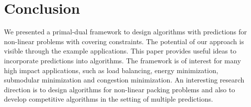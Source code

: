
\section{Conclusion}

We presented a primal-dual
framework to design algorithms with predictions for non-linear problems with covering constraints. The potential of our approach is visible through the example applications. This paper provides useful ideas to incorporate predictions into algorithms.
The framework is of interest for many high impact applications, such as load balancing, energy minimization, submodular minimization
and congestion minimization.
An interesting research direction is to design algorithms for non-linear packing problems
and also to develop competitive algorithms in the setting of multiple predictions.

